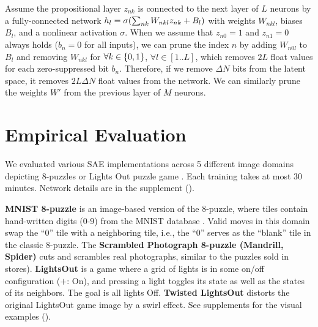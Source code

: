 Assume the propositional layer $z_{nk}$ is connected to the next layer of $L$ neurons
by a fully-connected network $h_l=\sigma{\left(\sum_{nk} W_{nkl}z_{nk}+B_l\right)}$
with weights $W_{nkl}$, biases $B_l$, and a nonlinear activation $\sigma$.
When we assume that $z_{n0}=1$ and $z_{n1}=0$ always holds ($b_n=0$ for all inputs),
we can prune the index $n$
by adding $W_{n0l}$ to $B_l$ and removing $W_{nkl}$ for $\forall k\in{\left\{0,1\right\}}$, $\forall l \in [1..L]$,
which removes $2L$ float values for each zero-suppressed bit $b_n$.
Therefore, if we remove $\Delta N$ bits from the latent space, it removes $2L\Delta N$ float values from the network.
We can similarly prune the weights $W'$ from the previous layer of $M$ neurons.


\section{Empirical Evaluation}
\label{evaluation}

We evaluated various SAE implementations across 5 different
image domains depicting 8-puzzles or Lights Out puzzle game \cite{lightsout}.
Each training takes at most 30 minutes.
Network details are in the supplement ().

\textbf{MNIST 8-puzzle}
is an image-based version of the 8-puzzle, where tiles contain hand-written digits (0-9) from the  MNIST database \cite{lecun1998gradient}.
Valid moves in this domain swap the ``0'' tile  with a neighboring tile, i.e., the ``0'' serves as the ``blank'' tile in the classic 8-puzzle. 
The \textbf{Scrambled Photograph 8-puzzle (Mandrill, Spider)} cuts and scrambles real photographs, similar to the puzzles sold in stores).
\textbf{LightsOut} \cite{lightsout} is
a game where a grid of lights is in some on/off configuration ($+$: On),
and pressing a light toggles its state as well as the states of its neighbors.
The goal is all lights Off.
\textbf{Twisted LightsOut} distorts the original LightsOut game image by a swirl effect.
See supplements for the visual examples ().

